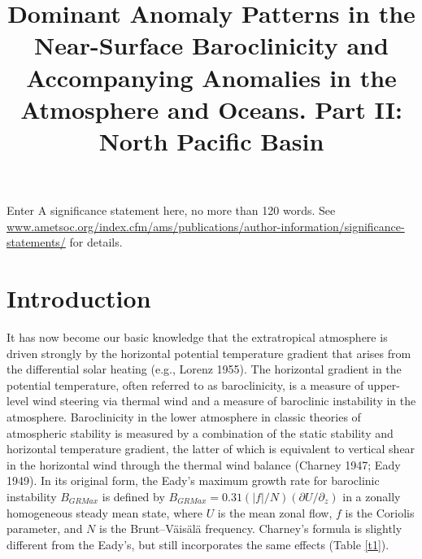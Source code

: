 \documentclass{ametsocv6.2}
\title{Dominant Anomaly Patterns in the Near-Surface 
Baroclinicity and Accompanying
Anomalies in the Atmosphere and Oceans. 
Part II: North Pacific Basin}
\affiliation{\aff{a}Japan Agency for Marine-Earth Science and Technology, Yokohama,
Kanagawa, Japan}
\begin{document}
\maketitle

%
%
%
\sigstatement
	 Enter A significance statement here, no more than 120 words. See \url{www.ametsoc.org/index.cfm/ams/publications/author-information/significance-statements/} for details.


%

\section{Introduction}

It has now become our basic
knowledge that the extratropical
atmosphere is driven strongly by the horizontal
potential temperature gradient that arises from the
differential solar heating (e.g., Lorenz 1955). The horizontal
gradient in the potential temperature, often referred
to as baroclinicity, is a measure of upper-level wind
steering via thermal wind and a measure of baroclinic
instability in the atmosphere. Baroclinicity in the lower
atmosphere in classic theories of atmospheric stability is
measured by a combination of the static stability and
horizontal temperature gradient, the latter of which is
equivalent to vertical shear in the horizontal wind through
the thermal wind balance (Charney 1947; Eady 1949). In
its original form, the Eady's maximum growth rate for
baroclinic instability $B_{GRMax}$ is defined by $B_{GRMax} =
0.31(|f|/N)(\partial U/\partial_z)$ in a zonally homogeneous steady
mean state, where $U$ is the mean zonal flow, $f$ is the
Coriolis parameter, and $N$ is the Brunt--V\"ais\"al\"a frequency.
Charney's formula is slightly different from the Eady's,
but still incorporates the same effects (Table \ref{t1}).
\end{document}
